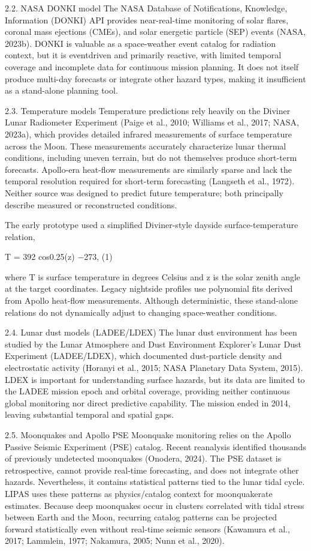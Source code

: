 2.2. NASA DONKI model The NASA Database of Notifications, Knowledge, Information (DONKI) API provides near-real-time monitoring of solar flares, coronal mass ejections (CMEs), and solar energetic particle (SEP) events (NASA, 2023b). DONKI is valuable as a space-weather event catalog for radiation context, but it is eventdriven and primarily reactive, with limited temporal coverage and incomplete data for continuous mission planning. It does not itself produce multi-day forecasts or integrate other hazard types, making it insufficient as a stand-alone planning tool.

2.3. Temperature models Temperature predictions rely heavily on the Diviner Lunar Radiometer Experiment (Paige et al., 2010; Williams et al., 2017; NASA, 2023a), which provides detailed infrared measurements of surface temperature across the Moon. These measurements accurately characterize lunar thermal conditions, including uneven terrain, but do not themselves produce short-term forecasts. Apollo-era heat-flow measurements are similarly sparse and lack the temporal resolution required for short-term forecasting (Langseth et al., 1972). Neither source was designed to predict future temperature; both principally describe measured or reconstructed conditions.

The early prototype used a simplified Diviner-style dayside surface-temperature relation,

T = 392 cos0.25(z) −273, (1)

where T is surface temperature in degrees Celsius and z is the solar zenith angle at the target coordinates. Legacy nightside profiles use polynomial fits derived from Apollo heat-flow measurements. Although deterministic, these stand-alone relations do not dynamically adjust to changing space-weather conditions.

2.4. Lunar dust models (LADEE/LDEX) The lunar dust environment has been studied by the Lunar Atmosphere and Dust Environment Explorer's Lunar Dust Experiment (LADEE/LDEX), which documented dust-particle density and electrostatic activity (Horanyi et al., 2015; NASA Planetary Data System, 2015). LDEX is important for understanding surface hazards, but its data are limited to the LADEE mission epoch and orbital coverage, providing neither continuous global monitoring nor direct predictive capability. The mission ended in 2014, leaving substantial temporal and spatial gaps.

2.5. Moonquakes and Apollo PSE Moonquake monitoring relies on the Apollo Passive Seismic Experiment (PSE) catalog. Recent reanalysis identified thousands of previously undetected moonquakes (Onodera, 2024). The PSE dataset is retrospective, cannot provide real-time forecasting, and does not integrate other hazards. Nevertheless, it contains statistical patterns tied to the lunar tidal cycle. LIPAS uses these patterns as physics/catalog context for moonquakerate estimates. Because deep moonquakes occur in clusters correlated with tidal stress between Earth and the Moon, recurring catalog patterns can be projected forward statistically even without real-time seismic sensors (Kawamura et al., 2017; Lammlein, 1977; Nakamura, 2005; Nunn et al., 2020).

